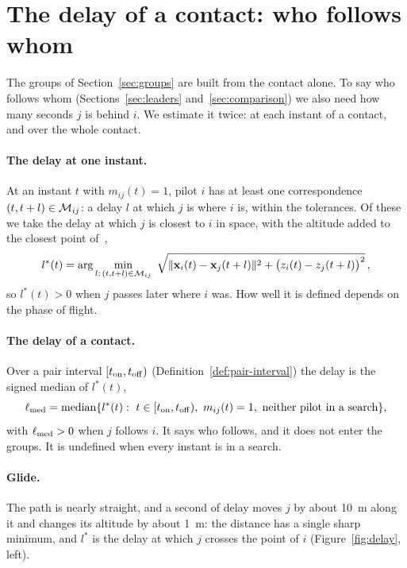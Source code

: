 \section{The delay of a contact: who follows whom}\label{sec:lag}

The groups of Section~\ref{sec:groups} are built from the contact alone. To say who follows whom
(Sections~\ref{sec:leaders} and~\ref{sec:comparison}) we also need how many seconds $j$ is behind
$i$. We estimate it twice: at each instant of a contact, and over the whole contact.

\paragraph{The delay at one instant.} At an instant $t$ with $m_{ij}(t)=1$, pilot $i$ has at least
one correspondence $(t,t+l)\in\mathcal{M}_{ij}$: a delay $l$ at which $j$ is where $i$ is, within the
tolerances. Of these we take the delay at which $j$ is closest to $i$ in space, with the altitude
added to the closest point of~\cite{li2013},
\begin{equation}\label{eq:lstar}
  l^*(t)=\arg\min_{l:\,(t,t+l)\in\M_{ij}}\ \sqrt{\|\x_i(t)-\x_j(t+l)\|^2+\bigl(z_i(t)-z_j(t+l)\bigr)^2}\,,
\end{equation}
so $l^*(t)>0$ when $j$ passes later where $i$ was. How well it is defined depends on the phase of
flight.

\paragraph{The delay of a contact.} Over a pair interval $[t_{\rm on},t_{\rm off})$
(Definition~\ref{def:pair-interval}) the delay is the signed median of $l^*(t)$,
\begin{equation}\label{eq:lmed}
  \ell_{\rm med}=\mathrm{median}\{l^*(t):\ t\in[t_{\rm on},t_{\rm off}),\ m_{ij}(t)=1,\ \text{neither
  pilot in a search}\},
\end{equation}
with $\ell_{\rm med}>0$ when $j$ follows $i$. It says who follows, and it does not enter the groups.
It is undefined when every instant is in a search.

\paragraph{Glide.} The path is nearly straight, and a second of delay moves $j$ by about 10~m along
it and changes its altitude by about 1~m: the distance has a single sharp minimum, and $l^*$ is the
delay at which $j$ crosses the point of $i$ (Figure~\ref{fig:delay}, left).

